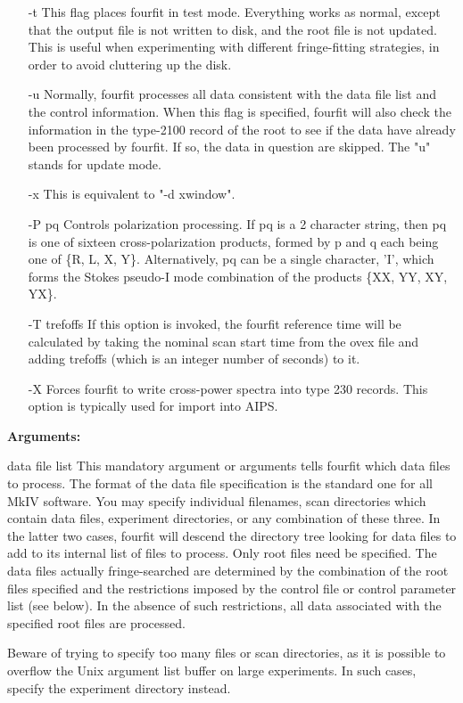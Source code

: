\begin{itemize}
\item[-t]
            This flag places fourfit in test mode.  Everything
            works as normal, except that the output file is not
            written to disk, and the root file is not updated.
            This is useful when experimenting with different
            fringe-fitting strategies, in order to avoid cluttering
            up the disk.

\item[-u]
            Normally, fourfit processes all data consistent with
            the data file list and the control information.  When
            this flag is specified, fourfit will also check the
            information in the type-2100 record of the root to 
            see if the data have already been processed by fourfit.
            If so, the data in question are skipped.  The "u"
            stands for update mode.

\item[-x]
            This is equivalent to "-d xwindow".

\item[-P pq]
            Controls polarization processing. If pq is a 2 character
            string, then pq is one of sixteen cross-polarization 
            products, formed by p and q each being one
            of \{R, L, X, Y\}. Alternatively, pq can be a single
            character, 'I', which forms the Stokes pseudo-I mode
            combination of the products \{XX, YY, XY, YX\}.

\item[-T trefoffs]
            If this option is invoked, the fourfit reference
            time will be calculated by taking the nominal scan
            start time from the ovex file and adding trefoffs
            (which is an integer number of seconds) to it.

\item[-X]
            Forces fourfit to write cross-power spectra into
            type 230 records. This option is typically used for
            import into AIPS.
\end{itemize}

\textbf{Arguments:}

            data file list
            This mandatory argument or arguments tells fourfit
            which data files to process.  The format of the data
            file specification is the standard one for all MkIV
            software.  You may specify individual filenames, 
            scan directories which contain data files, 
            experiment directories, or any combination of
            these three.  In the latter two cases,
            fourfit will descend the directory tree looking for
            data files to add to its internal list of files to
            process.  Only root files need be specified.  The
            data files actually fringe-searched are determined
            by the combination of the root files specified and the
            restrictions imposed by the control file or control
            parameter list (see below).  In the absence of 
            such restrictions, all data associated with the 
            specified root files are processed.

            Beware of trying to specify too many files or scan
            directories, as it is possible to overflow the Unix
            argument list buffer on large experiments.  In such
            cases, specify the experiment directory instead.

